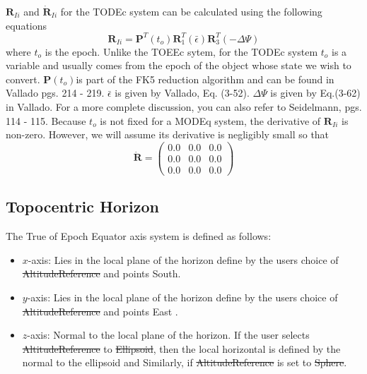 {$\mathbf{R}_{Ii}$ and $ \dot{\mathbf{R}}_{Ii}$ for the TODEc
system can be calculated using the following equations
%
\begin{equation}
      \mathbf{R}_{Ii} = \mathbf{P}^T(t_o)\mathbf{R}_1^T(\bar{\epsilon})\mathbf{R}_3^T(-\Delta \Psi)
\end{equation}
%
where $t_o$ is the epoch.  Unlike the TOEEc sytem, for the TODEc
system $t_o$ is a variable and usually comes from the epoch of the
object whose state we wish to convert.  $\mathbf{P}(t_o)$is part
of the FK5 reduction algorithm and can be found in Vallado pgs.
214 - 219.   $\bar{\epsilon}$ is given by Vallado\cite{vallado2},
Eq. (3-52).  $\Delta \Psi$ is given by Eq.(3-62) in
Vallado\cite{vallado2}.  For a more complete discussion, you can
also refer to Seidelmann\cite{seidelmann}, pgs. 114 - 115. Because
$t_o$ is not fixed for a MODEq system, the derivative of
$\mathbf{R}_{Ii}$ is non-zero. However, we will assume its
derivative is negligibly small so that
%
\begin{equation}
  \dot{\mathbf{R}} =   \begin{pmatrix}
     0.0 & 0.0 & 0.0\\
     0.0 & 0.0 & 0.0\\
     0.0 & 0.0 & 0.0
     \end{pmatrix}
\end{equation}

\subsection{Topocentric Horizon}  \label{Sec:TopocentricHorizon} 

The True of Epoch Equator axis system is defined as follows:
%
\begin{itemize}
\item $x$-axis:  Lies in the local plane of the horizon define by the users
                 choice of \st{AltitudeReference} and points
                 South.
%
\item $y$-axis:  Lies in the local plane of the horizon define by the users
                 choice of \st{AltitudeReference} and points
                 East .
%
\item $z$-axis:  Normal to the local plane of the horizon.  If the user selects \st{AltitudeReference}
                 to \st{Ellipsoid}, then the local horizontal is
                 defined by the normal to the ellipsoid and
                 Similarly, if  \st{AltitudeReference} is set to
                 \st{Sphere}.
\end{itemize}

}

